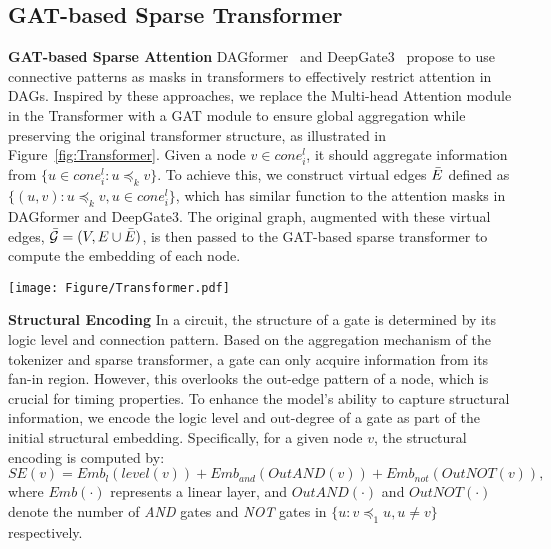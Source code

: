 \vspace{-5pt}
\subsection{GAT-based Sparse Transformer}
\vspace{-5pt}
\label{sec:transformer}
\begin{minipage}{0.65\textwidth}
    \noindent\textbf{GAT-based Sparse Attention} DAGformer~\citep{DAGformer} and DeepGate3~\citep{shi2024deepgate3} propose to use connective patterns as masks in transformers to effectively restrict attention in DAGs. Inspired by these approaches, we replace the Multi-head Attention module in the Transformer with a GAT module to ensure global aggregation while preserving the original transformer structure, as illustrated in Figure~\ref{fig:Transformer}. Given a node $v\in cone^l_i$, it should aggregate information from $\{u\in cone^l_i: u \preccurlyeq_k v \}$. To achieve this, we construct virtual edges $\Bar{E}$ defined as $\{(u, v): u \preccurlyeq_k v, u \in cone^l_i \}$, which has similar function to the attention masks in DAGformer and DeepGate3. The original graph, augmented with these virtual edges, \ie$ \Bar{{\mathcal{G}}}=(V,E\cup\Bar{E})$, is then passed to the GAT-based sparse transformer to compute the embedding of each node.
    
\end{minipage}
\hspace{3pt}
\begin{minipage}{0.35\textwidth}
    \centering
    \texttt{[image: Figure/Transformer.pdf]}
    \vspace{-10pt}
    \label{fig:Transformer}
\end{minipage}


\vspace{-5pt}
\noindent\textbf{Structural Encoding} 
In a circuit, the structure of a gate is determined by its logic level and connection pattern. Based on the aggregation mechanism of the tokenizer and sparse transformer, a gate can only acquire information from its fan-in region. However, this overlooks the out-edge pattern of a node, which is crucial for timing properties. To enhance the model's ability to capture structural information, we encode the logic level and out-degree of a gate as part of the initial structural embedding.
Specifically, for a given node $v$, the structural encoding is computed by:
\begin{equation}
    SE(v)=Emb_l(level(v))+Emb_{and}(OutAND(v))+Emb_{not}(OutNOT(v)),
\end{equation}
where $Emb(\cdot)$ represents a linear layer, and $OutAND(\cdot)$ and $OutNOT(\cdot)$ denote the number of \textit{AND} gates and \textit{NOT} gates in $\{u:v\preccurlyeq_1 u, u\neq v \}$ respectively.

